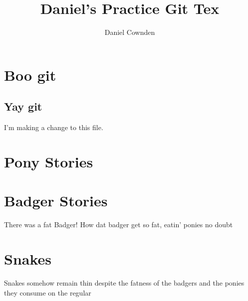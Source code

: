 \documentclass[11pt]{amsart}
\title{Daniel's Practice Git Tex}
\author{Daniel Cownden}
\begin{document}
\maketitle
\section{Boo git}
\subsection{Yay git}

I'm making a change to this file.

\section{Pony Stories}

\section{Badger Stories}
There was a fat Badger!
How dat badger get so fat, eatin' ponies no doubt

\section{Snakes}
Snakes somehow remain thin despite the fatness of the badgers and the ponies they consume on the regular
\end{document}
